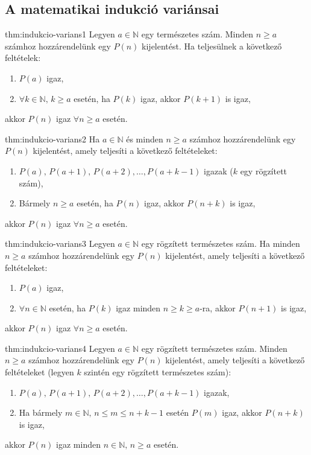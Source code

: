 \subsection*{A matematikai indukció variánsai}
\begin{theorem}{thm:indukcio-varians1} Legyen $a\in\mathbb{N}$ egy természetes
szám. Minden $n\ge a$ számhoz hozzárendelünk egy $P(n)$ kijelentést.
Ha teljesülnek a következő feltételek: 
\begin{enumerate}
\item $P(a)$ igaz, 
\item $\forall k\in\mathbb{N},\,k\ge a$ esetén, ha $P(k)$ igaz, akkor
$P(k+1)$ is igaz, 
\end{enumerate}
akkor $P(n)$ igaz $\forall n\ge a$ esetén. 
\end{theorem}

\begin{theorem}{thm:indukcio-varians2} Ha $a\in\mathbb{N}$
és minden $n\ge a$ számhoz hozzárendelünk egy $P(n)$ kijelentést,
amely teljesíti a következő feltételeket: 
\begin{enumerate}
\item $P(a),\,P(a+1),\,P(a+2),\ldots,P(a+k-1)$ igazak \quad{}($k$ egy
rögzített szám), 
\item Bármely $n\ge a$ esetén, ha $P(n)$ igaz, akkor $P(n+k)$ is igaz, 
\end{enumerate}
akkor $P(n)$ igaz $\forall n\ge a$ esetén. 
\end{theorem}

\begin{theorem}{thm:indukcio-varians3} Legyen $a\in\mathbb{N}$
egy rögzített természetes szám. Ha minden $n\ge a$ számhoz hozzárendelünk
egy $P(n)$ kijelentést, amely teljesíti a következő feltételeket: 
\begin{enumerate}
\item $P(a)$ igaz, 
\item $\forall n\in\mathbb{N}$ esetén, ha $P(k)$ igaz minden $n\ge k\ge a$-ra,
akkor $P(n+1)$ is igaz, 
\end{enumerate}
akkor $P(n)$ igaz $\forall n\ge a$ esetén. 
\end{theorem}

\begin{theorem}{thm:indukcio-varians4} Legyen $a\in\mathbb{N}$
egy rögzített természetes szám. Minden $n\ge a$ számhoz hozzárendelünk
egy $P(n)$ kijelentést, amely teljesíti a következő feltételeket
(legyen $k$ szintén egy rögzített természetes szám): 
\begin{enumerate}
\item $P(a),\,P(a+1),\,P(a+2),\ldots,P(a+k-1)$ igazak, 
\item Ha bármely $m\in\mathbb{N},\,n\le m\le n+k-1$ esetén $P(m)$ igaz,
akkor $P(n+k)$ is igaz, 
\end{enumerate}
akkor $P(n)$ igaz minden $n\in\mathbb{N},\,n\ge a$ esetén. 
\end{theorem}


